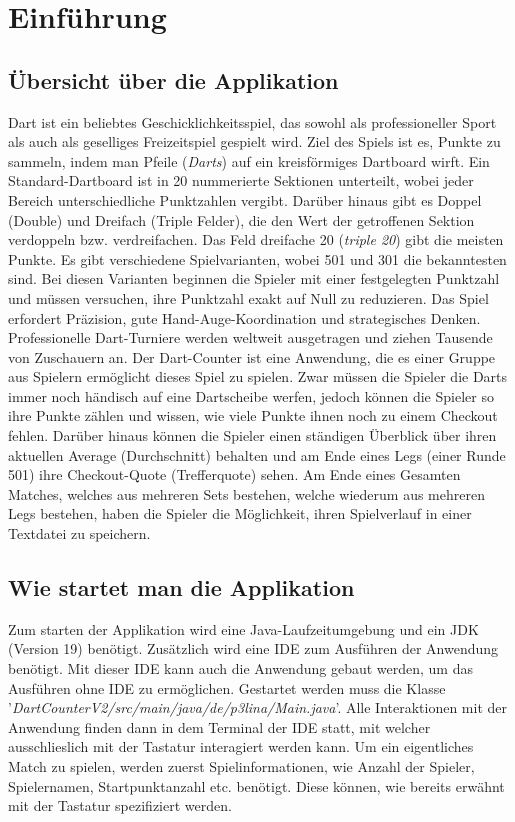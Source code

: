 \chapter{Einführung}
\section{Übersicht über die Applikation}
Dart ist ein beliebtes Geschicklichkeitsspiel, das sowohl als professioneller Sport als auch als geselliges Freizeitspiel gespielt wird. Ziel des Spiels ist es, Punkte zu sammeln, indem man Pfeile (\textit{Darts}) auf ein kreisförmiges Dartboard wirft. Ein Standard-Dartboard ist in 20 nummerierte Sektionen unterteilt, wobei jeder Bereich unterschiedliche Punktzahlen vergibt. Darüber hinaus gibt es Doppel (Double) und Dreifach (Triple Felder), die den Wert der getroffenen Sektion verdoppeln bzw. verdreifachen. Das Feld dreifache 20 (\textit{triple 20}) gibt die meisten Punkte. Es gibt verschiedene Spielvarianten, wobei 501 und 301 die bekanntesten sind. Bei diesen Varianten beginnen die Spieler mit einer festgelegten Punktzahl und müssen versuchen, ihre Punktzahl exakt auf Null zu reduzieren. Das Spiel erfordert Präzision, gute Hand-Auge-Koordination und strategisches Denken. Professionelle Dart-Turniere werden weltweit ausgetragen und ziehen Tausende von Zuschauern an. Der Dart-Counter ist eine Anwendung, die es einer Gruppe aus Spielern ermöglicht dieses Spiel zu spielen. Zwar müssen die Spieler die Darts immer noch händisch auf eine Dartscheibe werfen, jedoch können die Spieler so ihre Punkte zählen und wissen, wie viele Punkte ihnen noch zu einem Checkout fehlen. Darüber hinaus können die Spieler einen ständigen Überblick über ihren aktuellen Average (Durchschnitt) behalten und am Ende eines Legs (\zB einer Runde 501) ihre Checkout-Quote (Trefferquote) sehen. Am Ende eines Gesamten Matches, welches aus mehreren Sets bestehen, welche wiederum aus mehreren Legs bestehen, haben die Spieler die Möglichkeit, ihren Spielverlauf in einer Textdatei zu speichern.
\section{Wie startet man die Applikation}
Zum starten der Applikation wird eine Java-Laufzeitumgebung und ein JDK (Version 19) benötigt. Zusätzlich wird eine \acf{IDE} zum Ausführen der Anwendung benötigt. Mit dieser IDE kann auch die Anwendung gebaut werden, um das Ausführen ohne IDE zu ermöglichen. Gestartet werden muss die Klasse '\textit{DartCounterV2/src/main/java/de/p3lina/Main.java}'. Alle Interaktionen mit der Anwendung finden dann in dem Terminal der IDE statt, mit welcher ausschlieslich mit der Tastatur interagiert werden kann. Um ein eigentliches Match zu spielen, werden zuerst Spielinformationen, wie \zB Anzahl der Spieler, Spielernamen, Startpunktanzahl etc. benötigt. Diese können, wie bereits erwähnt mit der Tastatur spezifiziert werden.
